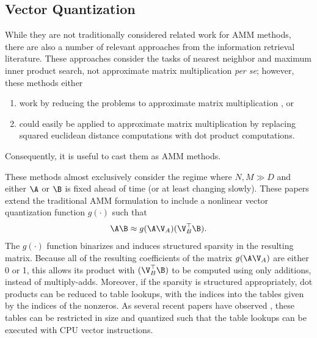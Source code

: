 
\subsection{Vector Quantization}

While they are not traditionally considered related work for AMM methods, there are also a number of relevant approaches from the information retrieval literature. These approaches consider the tasks of nearest neighbor and maximum inner product search, not approximate matrix multiplication \textit{per se}; however, these methods either
\begin{enumerate}
    \item work by reducing the problems to approximate matrix multiplication \cite{cq, aq, otq, scq, stackedQuantizers, bolt}, or
    \item could easily be applied to approximate matrix multiplication by replacing squared euclidean distance computations with dot product computations. \cite{pq, quickAdc, quickerAdc, pairq, grvq, opq, polysemous}
\end{enumerate}
Consequently, it is useful to cast them as AMM methods.

These methods almost exclusively consider the regime where $N, M \gg D$ and either $\A$ or $\B$ is fixed ahead of time (or at least changing slowly). These papers extend the traditional AMM formulation to include a nonlinear vector quantization function $g(\cdot)$ such that
\begin{align}
    \A \B \approx g(\A \V_A) (\V_B^\top \B).
\end{align}
The $g(\cdot)$ function binarizes and induces structured sparsity in the resulting matrix. Because all of the resulting coefficients of the matrix $g(\A \V_A)$ are either 0 or 1, this allows its product with $(\V_B^\top \B)$ to be computed using only additions, instead of multiply-adds. Moreover, if the sparsity is structured appropriately, dot products can be reduced to table lookups, with the indices into the tables given by the indices of the nonzeros. As several recent papers have observed \cite{bolt, quickAdc, quickerAdc}, these tables can be restricted in size and quantized such that the table lookups can be executed with CPU vector instructions.

